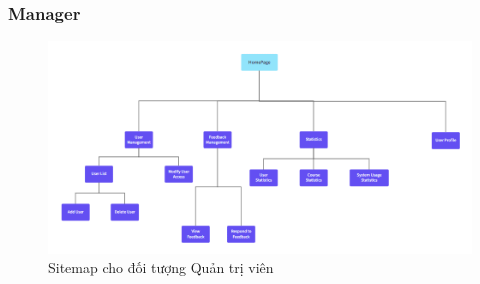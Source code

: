 \subsubsection{Manager}
\begin{figure}[H]
    \centering
    \includegraphics[scale=0.55]{Images/sitemap/Manager.png}
    \caption{Sitemap cho đối tượng Quản trị viên}
    \label{fig:enter-label}
\end{figure}
